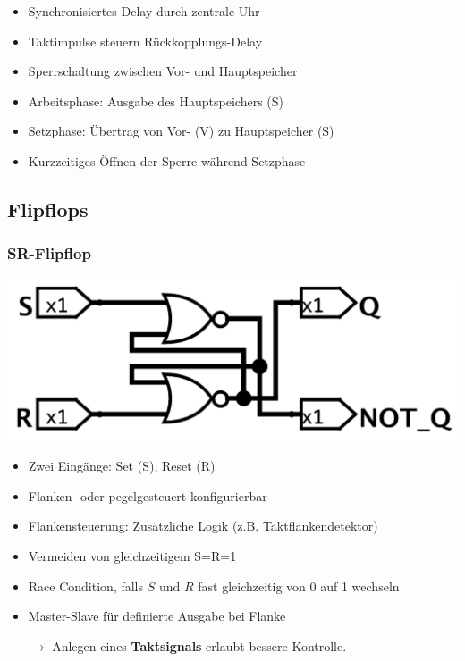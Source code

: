 \documentclass[a4paper,6pt]{article}
\begin{document}
\begin{multicols*}{3}
\begin{itemize}
    \item Synchronisiertes Delay durch zentrale Uhr
    \item Taktimpulse steuern Rückkopplungs-Delay
    \item Sperrschaltung zwischen Vor- und Hauptspeicher
    \item Arbeitsphase: Ausgabe des Hauptspeichers (S)
    \item Setzphase: Übertrag von Vor- (V) zu Hauptspeicher (S)
    \item Kurzzeitiges Öffnen der Sperre während Setzphase
\end{itemize}

\subsection*{Flipflops}

\subsubsection*{SR-Flipflop}

\begin{center}
    \includegraphics[width=0.75\linewidth]{resources/SR_FlipFlop.png}
\end{center}

\begin{itemize}
    \item Zwei Eingänge: Set (S), Reset (R)
    \item Flanken- oder pegelgesteuert konfigurierbar
    \item Flankensteuerung: Zusätzliche Logik (z.B. Taktflankendetektor)
    \item Vermeiden von gleichzeitigem S=R=1
    \item Race Condition, falls $S$ und $R$ fast gleichzeitig von 0 auf 1 wechseln
    \item Master-Slave für definierte Ausgabe bei Flanke
    \item[$\rightarrow$] Anlegen eines \textbf{Taktsignals} erlaubt bessere Kontrolle.
\end{itemize}


\end{multicols*}
\end{document}
